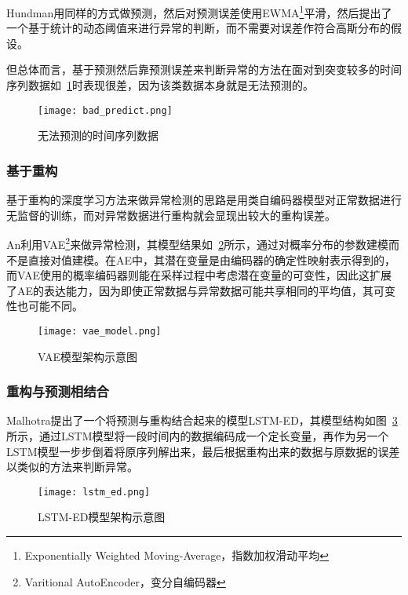 Hundman\cite{DBLP:conf/kdd/HundmanCLCS18}用同样的方式做预测，然后对预测误差使用EWMA\footnote{Exponentially Weighted Moving-Average，指数加权滑动平均}平滑，然后提出了一个基于统计的动态阈值来进行异常的判断，而不需要对误差作符合高斯分布的假设。

但总体而言，基于预测然后靠预测误差来判断异常的方法在面对到突变较多的时间序列数据如~\ref{fig:bad:predict}时表现很差，因为该类数据本身就是无法预测的。

\begin{figure}[htbp]
    \centering
    \texttt{[image: bad\_predict.png]}
    \caption{无法预测的时间序列数据\cite{malhotra2016lstm}}
    \label{fig:bad:predict}
  \end{figure}

\subsubsection{基于重构}

基于重构的深度学习方法来做异常检测的思路是用类自编码器模型对正常数据进行无监督的训练，而对异常数据进行重构就会显现出较大的重构误差。

An\cite{an2015variational}利用VAE\footnote{Varitional AutoEncoder，变分自编码器}来做异常检测，其模型结果如~\ref{fig:vae:model}所示，通过对概率分布的参数建模而不是直接对值建模。在AE中，其潜在变量是由编码器的确定性映射表示得到的，而VAE使用的概率编码器则能在采样过程中考虑潜在变量的可变性，因此这扩展了AE的表达能力，因为即使正常数据与异常数据可能共享相同的平均值，其可变性也可能不同。

\begin{figure}[htbp]
    \centering
    \texttt{[image: vae\_model.png]}
    \caption{VAE模型架构示意图\cite{an2015variational}}
    \label{fig:vae:model}
  \end{figure}

\subsubsection{重构与预测相结合}
Malhotra\cite{malhotra2016lstm}提出了一个将预测与重构结合起来的模型LSTM-ED，其模型结构如图~\ref{fig:lstm:ed}所示，通过LSTM模型将一段时间内的数据编码成一个定长变量，再作为另一个LSTM模型一步步倒着将原序列解出来，最后根据重构出来的数据与原数据的误差以\cite{malhotra2015long}类似的方法来判断异常。

\begin{figure}[htbp]
    \centering
    \texttt{[image: lstm\_ed.png]}
    \caption{LSTM-ED模型架构示意图\cite{malhotra2016lstm}}
    \label{fig:lstm:ed}
  \end{figure}


